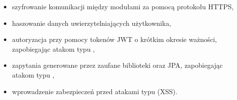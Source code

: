 \begin{itemize}
    \item szyfrowanie komunikacji między modułami za pomocą protokołu HTTPS,
    \item haszowanie danych uwierzytelniających użytkownika,
    \item autoryzacja przy pomocy tokenów JWT o krótkim okresie ważności, zapobiegając atakom typu ,
    \item zapytania generowane przez zaufane biblioteki oraz JPA, zapobiegając atakom typu ,
    \item wprowadzenie zabezpieczeń przed atakami typu  (XSS).
\end{itemize}